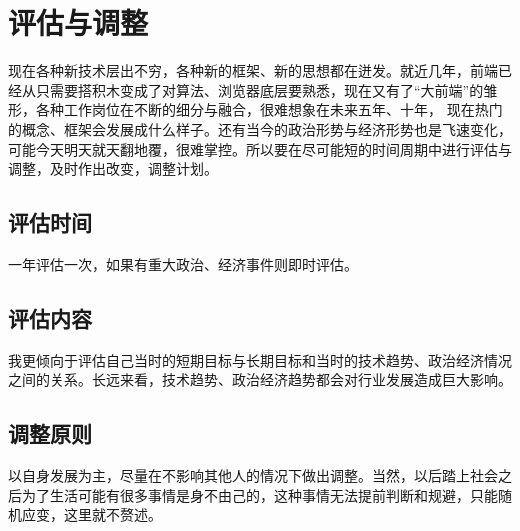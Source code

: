 \documentclass{article}
\begin{document}
\section{评估与调整}
现在各种新技术层出不穷，各种新的框架、新的思想都在迸发。就近几年，前端已经从只需要搭积木变成了对算法、浏览器底层要熟悉，现在又有了“大前端”的雏形，各种工作岗位在不断的细分与融合，很难想象在未来五年、十年，
现在热门的概念、框架会发展成什么样子。还有当今的政治形势与经济形势也是飞速变化，可能今天明天就天翻地覆，很难掌控。所以要在尽可能短的时间周期中进行评估与调整，及时作出改变，调整计划。
\subsection{评估时间}
一年评估一次，如果有重大政治、经济事件则即时评估。
\subsection{评估内容}
我更倾向于评估自己当时的短期目标与长期目标和当时的技术趋势、政治经济情况之间的关系。长远来看，技术趋势、政治经济趋势都会对行业发展造成巨大影响。
\subsection{调整原则}
以自身发展为主，尽量在不影响其他人的情况下做出调整。当然，以后踏上社会之后为了生活可能有很多事情是身不由己的，这种事情无法提前判断和规避，只能随机应变，这里就不赘述。
\end{document}
